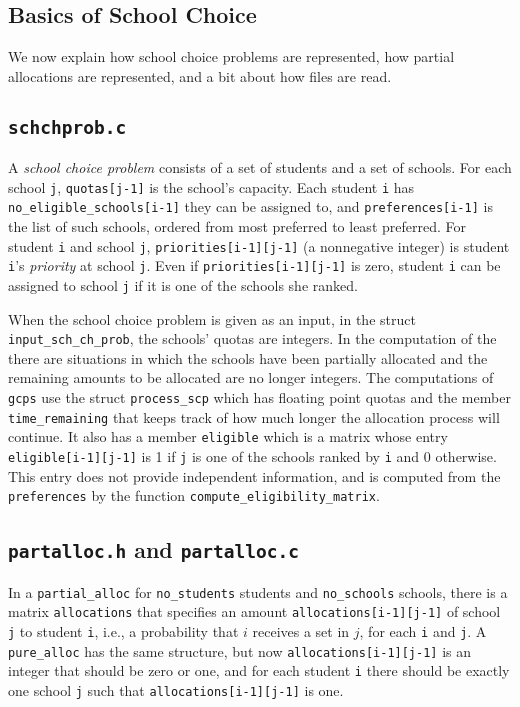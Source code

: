 \documentclass[12pt]{article}
\theoremstyle{definition}
\begin{document}
\begin{appendix}
\section{Basics of School Choice}

We now explain how school choice problems are represented, how partial
allocations are represented, and a bit about how files are read.

\subsection{\texttt{schchprob.c}}

A \emph{school choice problem} consists of a set of students and a set
of schools.  For each school \texttt{j}, \texttt{quotas[j-1]} is the
school's capacity.  Each student \texttt{i} has
\texttt{no\_eligible\_schools[i-1]} they can be assigned to, and
\texttt{preferences[i-1]} is the list of such schools, ordered from
most preferred to least preferred.  For student \texttt{i} and school
\texttt{j}, \texttt{priorities[i-1][j-1]} (a nonnegative integer) is
student \texttt{i}'s \emph{priority} at school \texttt{j}. Even if
\texttt{priorities[i-1][j-1]} is zero, student \texttt{i} can be
assigned to school \texttt{j} if it is one of the schools she ranked.

When the school choice problem is given as an input, in the struct
\texttt{input\_sch\_ch\_prob}, the schools' quotas are integers.  In
the computation of the  there are situations in which the
schools have been partially allocated and the remaining amounts to be
allocated are no longer integers. The computations of \texttt{gcps}
use the struct \texttt{process\_scp} which has floating point quotas
and the member \texttt{time\_remaining} that keeps track of how much
longer the allocation process will continue.  It also has a member
\texttt{eligible} which is a matrix whose entry
\texttt{eligible[i-1][j-1]} is 1 if \texttt{j} is one of the schools
ranked by \texttt{i} and 0 otherwise.  This entry does not provide
independent information, and is computed from the \texttt{preferences}
by the function \texttt{compute\_eligibility\_matrix}.

\subsection{\texttt{partalloc.h} and \texttt{partalloc.c}}

In a \texttt{partial\_alloc} for \texttt{no\_students} students and
\texttt{no\_schools} schools, there is a matrix \texttt{allocations}
that specifies an amount \texttt{allocations[i-1][j-1]} of school
\texttt{j} to student \texttt{i}, i.e., a probability that $i$
receives a set in $j$, for each \texttt{i} and \texttt{j}.  A
\texttt{pure\_alloc} has the same structure, but now
\texttt{allocations[i-1][j-1]} is an integer that should be zero or
one, and for each student \texttt{i} there should be exactly one
school \texttt{j} such that \texttt{allocations[i-1][j-1]} is one.


\end{appendix}
\end{document}
